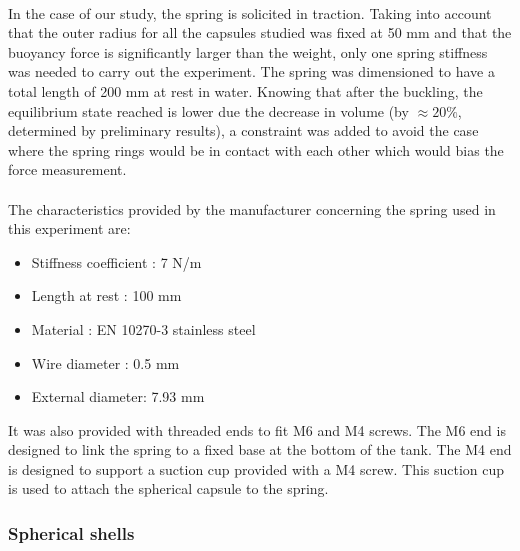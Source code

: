 \paragraph{}
In the case of our study, the spring is solicited in traction. Taking into account that the outer radius for all the capsules studied was fixed at 50 mm and that the buoyancy force is significantly larger than the weight, only one spring stiffness was needed to carry out the experiment.
The spring was dimensioned to have a total length of 200 mm at rest in water. Knowing that after the buckling, the equilibrium state reached is lower due the decrease in volume (by $\approx 20\%$, determined by preliminary results), a constraint was added to avoid the case where the spring rings would be in contact with each other which would bias the force measurement.
\paragraph{}
The characteristics provided by the manufacturer concerning the spring used in this experiment are:
\
\begin{itemize}
	\item Stiffness coefficient : 7 N/m
	\item Length at rest : 100 mm 
	\item Material : EN 10270-3 stainless steel
	\item Wire diameter : 0.5 mm
	\item External diameter: 7.93 mm
\end{itemize}

It was also provided with threaded ends to fit M6 and M4 screws. The M6 end is designed to link the spring to a fixed base at the bottom of the tank. The M4 end is designed to support a suction cup provided with a M4 screw. This suction cup is used to attach the spherical capsule to the spring.


\subsubsection{Spherical shells}
\label{sec:Spherical_shells}
